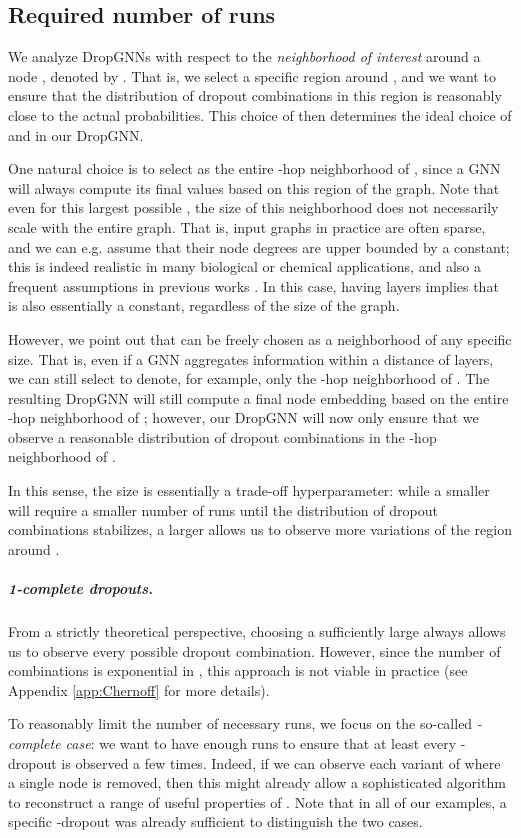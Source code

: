 \documentclass{article}
\begin{document}
\subsection{Required number of runs}

We analyze DropGNNs with respect to the \textit{neighborhood of interest} around a node , denoted by . That is, we select a specific region around , and we want to ensure that the distribution of dropout combinations in this region is reasonably close to the actual probabilities. This choice of  then determines the ideal choice of  and  in our DropGNN.

One natural choice is to select  as the entire -hop neighborhood of , since a GNN will always compute its final values based on this region of the graph. Note that even for this largest possible , the size of this neighborhood  does not necessarily scale with the entire graph. That is, input graphs in practice are often sparse, and we can e.g. assume that their node degrees are upper bounded by a constant; this is indeed realistic in many biological or chemical applications, and also a frequent assumptions in previous works \citep{ports}. In this case, having  layers implies that  is also essentially a constant, regardless of the size of the graph.

However, we point out that  can be freely chosen as a neighborhood of any specific size. That is, even if a GNN aggregates information within a distance of  layers, we can still select  to denote, for example, only the -hop neighborhood of . The resulting DropGNN will still compute a final node embedding based on the entire -hop neighborhood of ; however, our DropGNN will now only ensure that we observe a reasonable distribution of dropout combinations in the -hop neighborhood of .

In this sense, the size  is essentially a trade-off hyperparameter: while a smaller  will require a smaller number of runs  until the distribution of dropout combinations stabilizes, a larger  allows us to observe more variations of the region around .

\subparagraph*{1-complete dropouts.} From a strictly theoretical perspective, choosing a sufficiently large  always allows us to observe every possible dropout combination. However, since the number of combinations is exponential in , this approach is not viable in practice (see Appendix \ref{app:Chernoff} for more details).

To reasonably limit the number of necessary runs, we focus on the so-called \emph{-complete case}: we want to have enough runs to ensure that at least every -dropout is observed a few times. Indeed, if we can observe each variant of  where a single node is removed, then this might already allow a sophisticated algorithm to reconstruct a range of useful properties of . Note that in all of our examples, a specific -dropout was already sufficient to distinguish the two cases.
\end{document}
